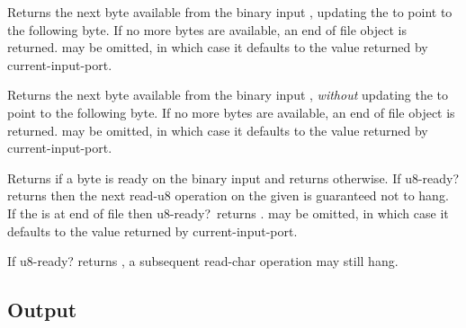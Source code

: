 \begin{entry}{%
}

Returns the next byte available from the binary input ,
updating the  to point to the following byte.  
If no more bytes are
available, an end of file object is returned.   may be
omitted, in which case it defaults to the value returned by {\cf
  current-input-port}.

\end{entry}


\begin{entry}{%
}

Returns the next byte available from the binary input ,
{\em without} updating the  to point to the following
byte.  If no more bytes are available, an end of file object is
returned.   may be omitted, in which case it defaults to the
value returned by {\cf current-input-port}.

\end{entry}


\begin{entry}{%
}

Returns \schtrue{} if a byte is ready on the binary input 
and returns \schfalse{} otherwise.  If {\cf u8-ready?} returns
\schtrue{} then the next {\cf read-u8} operation on the given
 is guaranteed not to hang.  If the  is at end of
file then {\cf u8-ready?}\ returns \schtrue.   may be
omitted, in which case it defaults to the value returned by {\cf
  current-input-port}.

\begin{note}
If {\cf u8-ready?} returns \schtrue{}, a subsequent {\cf read-char}
operation may still hang.
\end{note}
\end{entry}

\subsection{Output}
\label{outputsection}

\noindent \hbox{}
\vspace{-5ex}

